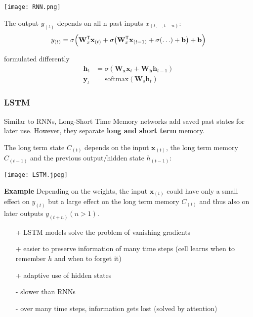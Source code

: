 \newpar{}
\begin{center}
    \texttt{[image: RNN.png]}
\end{center}
The output $y_{(t)}$ depends on all n past inputs $x_{(t,\ldots,t-n)}$:
\noindent\begin{equation*}
    y_{(t)} = \sigma\Bigl(\mathbf{W}_x^{\mathsf{T}}\mathbf{x}_{(t)} + \sigma\bigl(\mathbf{W}_x^{\mathsf{T}}\mathbf{x}_{(t-1)} + \sigma( \ldots ) + \mathbf{b}\bigr) + \mathbf{b}\Bigr)
\end{equation*}

formulated differently
\noindent\begin{align*}
    \mathbf{h}_t & = \sigma(\mathbf{W}_\mathbf{x} \mathbf{x}_t + \mathbf{W}_\mathbf{h} \mathbf{h}_{t-1}) \\
    \mathbf{y}_t & = \mathrm{softmax}(\mathbf{W}_s \mathbf{h}_t)
\end{align*}

\subsubsection{LSTM}
Similar to RNNs, Long-Short Time Memory networks add saved past states for later use. However, they separate \textbf{long and short term} memory.

The long term state $C_{(t)}$ depends on the input $\mathbf{x}_{(t)}$, the long term memory $C_{(t-1)}$ and the previous output/hidden state $h_{(t-1)}$:
\begin{center}
    \texttt{[image: LSTM.jpeg]}
\end{center}

\textbf{Example}
Depending on the weights, the input $\mathbf{x}_{(t)}$ could have only a small effect on $y_{(t)}$ but a large effect on the long term memory $C_{(t)}$ and thus also on later outputs $y_{(t+n)} (n>1)$.

\newpar{}
\begin{itemize}
    \item [+] LSTM models solve the problem of vanishing gradients
    \item [+] easier to preserve information of many time steps (cell learns when to remember $h$ and when to forget it)
    \item [+] adaptive use of hidden states
    \item [-] slower than RNNs
    \item [-] over many time steps, information gets lost (solved by attention)
\end{itemize}
